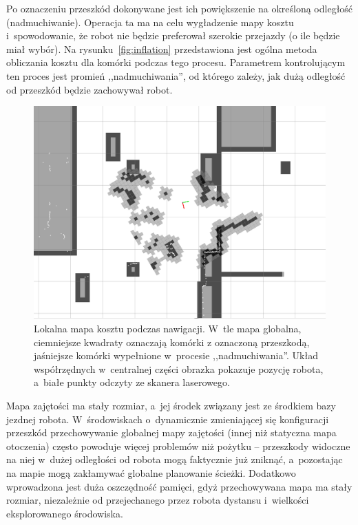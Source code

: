Po oznaczeniu przeszkód dokonywane jest ich powiększenie na określoną odległość
(nadmuchiwanie). Operacja ta ma na celu wygładzenie mapy kosztu i~spowodowanie,
że robot nie będzie preferował szerokie przejazdy (o ile będzie miał wybór). Na
rysunku~\ref{fig:inflation} przedstawiona jest ogólna metoda obliczania kosztu
dla komórki podczas tego procesu. Parametrem kontrolującym ten proces jest
promień ,,nadmuchiwania'', od którego zależy, jak dużą odległość od
przeszkód będzie zachowywał robot.

\begin{figure}[htb!]
\centering
\includegraphics[width=13cm]{../img/costmap}
\caption[Mapa kosztu]{Lokalna mapa kosztu podczas nawigacji. W~tle mapa globalna, ciemniejsze
kwadraty oznaczają komórki z oznaczoną przeszkodą, jaśniejsze komórki wypełnione
w~procesie ,,nadmuchiwania''. Układ współrzędnych w~centralnej części obrazka pokazuje
pozycję robota, a~białe punkty odczyty ze skanera laserowego.}
\label{fig:costmap}
\end{figure}

Mapa zajętości ma stały rozmiar, a~jej środek związany jest ze środkiem bazy
jezdnej robota. W~środowiskach o~dynamicznie zmieniającej się konfiguracji
przeszkód przechowywanie globalnej mapy zajętości (innej niż statyczna mapa
otoczenia) często powoduje więcej problemów niż pożytku -- przeszkody widoczne
na niej w~dużej odległości od robota mogą faktycznie już zniknąć, a~pozostając
na mapie mogą zakłamywać globalne planowanie ścieżki. Dodatkowo wprowadzona jest
duża oszczędność pamięci, gdyż przechowywana mapa ma stały rozmiar, niezależnie
od przejechanego przez robota dystansu i~wielkości eksplorowanego środowiska.

